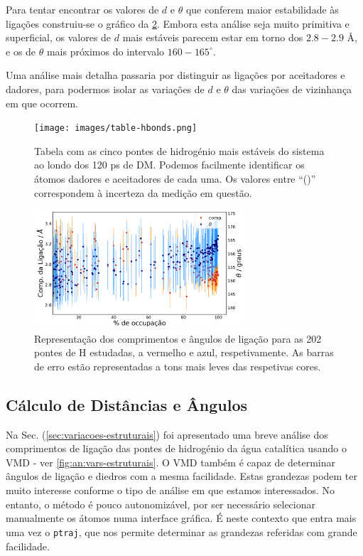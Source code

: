 \documentclass[12pt,a4paper]{article}
\begin{document}
	Para tentar encontrar os valores de $d$ e $\theta$ que conferem maior estabilidade às ligações construiu-se o gráfico da \cref{fig:an:hbonds-plot}. Embora esta análise seja muito primitiva e superficial, os valores de $d$ mais estáveis parecem estar em torno dos $2.8 - 2.9$ \AA, e os de $\theta$ mais próximos do intervalo $160 - 165 ^{\circ}$.
	
	Uma análise mais detalha passaria por distinguir as ligações por aceitadores e dadores, para podermos isolar as variações de $d$ e $\theta$ das variações de vizinhança em que ocorrem.
	
	\begin{figure}[h]
		\centering
		\texttt{[image: images/table-hbonds.png]}
		\caption{Tabela com as cinco pontes de hidrogénio mais estáveis do sistema ao londo dos 120 ps de DM. Podemos facilmente identificar os átomos dadores e aceitadores de cada uma. Os valores entre ``()'' correspondem à incerteza da medição em questão.}
		\label{fig:an:hbonds-table}
	\end{figure}
	\begin{figure}[h]
		\centering
		\includegraphics[width=0.7\textwidth]{images/plots-hbonds-linear.pdf}
		\caption{Representação dos comprimentos e ângulos de ligação para as 202 pontes de H estudadas, a vermelho e azul, respetivamente. As barras de erro estão representadas a tons mais leves das respetivas cores.}
		\label{fig:an:hbonds-plot}	
	\end{figure}


\subsection{Cálculo de Distâncias e Ângulos}
	Na Sec. (\ref{sec:variacoes-estruturais}) foi apresentado uma breve análise dos comprimentos de ligação das pontes de hidrogénio da água catalítica usando o VMD - ver \cref{fig:an:vars-estruturais}. O VMD também é capaz de determinar ângulos de ligação e diedros com a mesma facilidade. Estas grandezas podem ter muito interesse conforme o tipo de análise em que estamos interessados. No entanto, o método é pouco autonomizável, por ser necessário selecionar manualmente os átomos numa interface gráfica. É neste contexto que entra mais uma vez o \verb|ptraj|, que nos permite determinar as grandezas referidas com grande facilidade.
	
\end{document}
